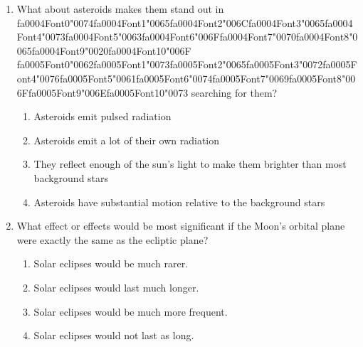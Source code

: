 \documentclass[12pt]{article}
\begin{document}
\begin{enumerate}[label=\arabic*.]
\begin{enumerate}[label=(\alph*)]
\end{enumerate}
\item What about asteroids makes them stand out in {\csname fa0004Font0\endcsname\char"0074}{\csname fa0004Font1\endcsname\char"0065}{\csname fa0004Font2\endcsname\char"006C}{\csname fa0004Font3\endcsname\char"0065}{\csname fa0004Font4\endcsname\char"0073}{\csname fa0004Font5\endcsname\char"0063}{\csname fa0004Font6\endcsname\char"006F}{\csname fa0004Font7\endcsname\char"0070}{\csname fa0004Font8\endcsname\char"0065}{\csname fa0004Font9\endcsname\char"0020}{\csname fa0004Font10\endcsname\char"006F} {\csname fa0005Font0\endcsname\char"0062}{\csname fa0005Font1\endcsname\char"0073}{\csname fa0005Font2\endcsname\char"0065}{\csname fa0005Font3\endcsname\char"0072}{\csname fa0005Font4\endcsname\char"0076}{\csname fa0005Font5\endcsname\char"0061}{\csname fa0005Font6\endcsname\char"0074}{\csname fa0005Font7\endcsname\char"0069}{\csname fa0005Font8\endcsname\char"006F}{\csname fa0005Font9\endcsname\char"006E}{\csname fa0005Font10\endcsname\char"0073} searching for them?
\begin{enumerate}[label=(\alph*)]
    \item Asteroids emit pulsed radiation
    \item Asteroids emit a lot of their own radiation
    \item They reflect enough of the sun's light to make them brighter than most background stars
    \item Asteroids have substantial motion relative to the background stars
\end{enumerate}
\item What effect or effects would be most significant if the Moon's orbital plane were exactly
the same as the ecliptic plane?
\begin{enumerate}[label=(\alph*)]
    \item Solar eclipses would be much rarer.
    \item Solar eclipses would last much longer.
    \item Solar eclipses would be much more frequent.
    \item Solar eclipses would not last as long.
\end{enumerate}
\end{enumerate}
\end{document}
